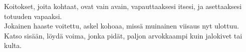 \documentclass{article}
\begin{document}
\begin{infobox}
Koitokset, joita kohtaat, ovat vain avain, vapauttaaksesi itsesi, ja asettaaksesi totuuden vapaaksi.\\
Jokainen haaste voitettu, askel kohoaa, missä muinainen viisaus nyt ulottuu.\\
Katso sisään, löydä voima, jonka pidät, paljon arvokkaampi kuin jalokivet tai kulta.
\end{infobox}
\end{document}
